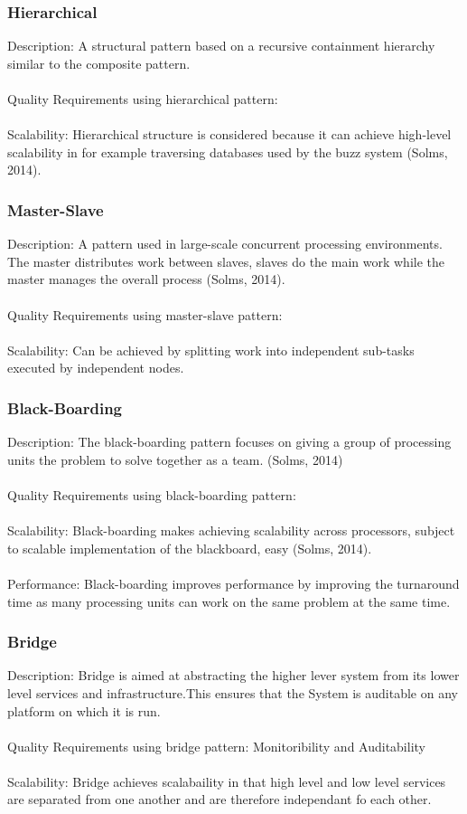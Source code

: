 \subsubsection{Hierarchical}
Description: A structural pattern based on a recursive containment hierarchy similar to the composite pattern.\\
\\
Quality Requirements using hierarchical pattern:\\
\\
Scalability: Hierarchical structure is considered because it can achieve high-level scalability in for example traversing databases used by the buzz system (Solms, 2014).\\
\subsubsection{Master-Slave}
Description: A pattern used in large-scale concurrent processing environments. The master distributes work between slaves, slaves do the main work while the master manages the  overall process (Solms, 2014). \\
\\
Quality Requirements using master-slave pattern:\\
\\
Scalability: Can be achieved by splitting work into independent sub-tasks executed by independent nodes.\\
\subsubsection{Black-Boarding}
Description: The black-boarding pattern focuses on giving a group of processing units the problem to solve together as a team. (Solms, 2014)\\
\\
Quality Requirements using black-boarding pattern:\\
\\
Scalability: Black-boarding makes achieving scalability across processors, subject to scalable implementation of the blackboard, easy (Solms, 2014).\\
\\
 Performance: Black-boarding improves performance by improving the turnaround time as many processing units can work on the same problem at the same time.\\ 
\subsubsection{Bridge}
Description: Bridge is aimed at abstracting the higher lever system from its lower level services and infrastructure.This ensures that the System is auditable on any platform on which it is run.\\
\\
Quality Requirements using bridge pattern: Monitoribility and Auditability\\
\\
Scalability: Bridge achieves scalabaility in that high level and low level services are separated from one another and are therefore independant fo each other.\\
